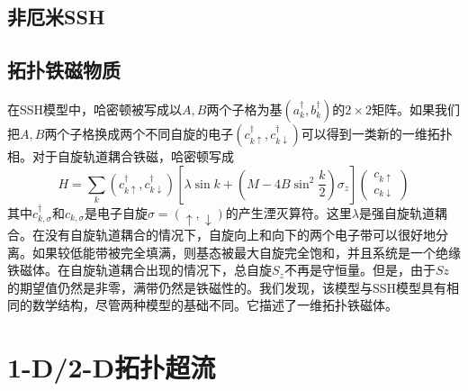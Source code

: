 \documentclass{article}
\numberwithin{equation}{subsection}
\begin{document}
\subsection{非厄米SSH}

\subsection{拓扑铁磁物质}
在SSH模型中，哈密顿被写成以$A,B$两个子格为基$(a_k^\dagger,b_k^\dagger)$的$2\times 2$矩阵。如果我们把$A,B$两个子格换成两个不同自旋的电子$(c_{k\uparrow}^\dagger,c_{k\downarrow}^\dagger)$可以得到一类新的一维拓扑相。对于自旋轨道耦合铁磁，哈密顿写成
\begin{equation}
    H=\sum_{k}(c_{k\uparrow}^\dagger,c_{k\downarrow}^\dagger)\left[\lambda\sin k+(M-4B\sin^2\frac{k}{2})\sigma_z\right]\begin{pmatrix}
        c_{k\uparrow}\\
        c_{k\downarrow}
    \end{pmatrix}
\end{equation}
其中$c_{k,\sigma}^\dagger$和$c_{k,\sigma}$是电子自旋$\sigma=(\uparrow,\downarrow)$的产生湮灭算符。这里$\lambda$是强自旋轨道耦合。在没有自旋轨道耦合的情况下，自旋向上和向下的两个电子带可以很好地分离。如果较低能带被完全填满，则基态被最大自旋完全饱和，并且系统是一个绝缘铁磁体。在自旋轨道耦合出现的情况下，总自旋$S_z$不再是守恒量。但是，由于$Sz$的期望值仍然是非零，满带仍然是铁磁性的。我们发现，该模型与SSH模型具有相同的数学结构，尽管两种模型的基础不同。它描述了一维拓扑铁磁体。

\section{1-D/2-D拓扑超流}
\end{document}
